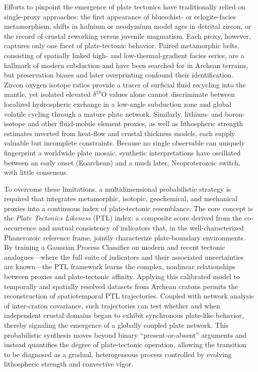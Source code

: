 \documentclass{article}
\begin{document}
Efforts to pinpoint the emergence of plate tectonics have traditionally relied on single-proxy approaches: the first appearance of blueschist- or eclogite-facies metamorphism, shifts in hafnium or neodymium model ages in detrital zircon, or the record of crustal reworking versus juvenile magmatism. Each proxy, however, captures only one facet of plate-tectonic behavior. Paired metamorphic belts, consisting of spatially linked high- and low-thermal-gradient facies series, are a hallmark of modern subduction and have been searched for in Archean terrains, but preservation biases and later overprinting confound their identification. Zircon oxygen isotope ratios provide a tracer of surficial fluid recycling into the mantle, yet isolated elevated \(\delta^{18}\text{O}\) values alone cannot discriminate between localized hydrospheric exchange in a low-angle subduction zone and global volatile cycling through a mature plate network. Similarly, lithium- and boron-isotope and other fluid-mobile element proxies, as well as lithospheric strength estimates inverted from heat-flow and crustal thickness models, each supply valuable but incomplete constraints. Because no single observable can uniquely fingerprint a worldwide plate mosaic, synthetic interpretations have oscillated between an early onset (Eoarchean) and a much later, Neoproterozoic switch, with little consensus.

To overcome these limitations, a multidimensional probabilistic strategy is required that integrates metamorphic, isotopic, geochemical, and mechanical proxies into a continuous index of plate-tectonic resemblance. The core concept is the \textit{Plate Tectonics Likeness} (PTL) index: a composite score derived from the co-occurrence and mutual consistency of indicators that, in the well-characterized Phanerozoic reference frame, jointly characterize plate-boundary environments. By training a Gaussian Process Classifier on modern and recent tectonic analogues—where the full suite of indicators and their associated uncertainties are known—the PTL framework learns the complex, nonlinear relationships between proxies and plate-tectonic affinity. Applying this calibrated model to temporally and spatially resolved datasets from Archean cratons permits the reconstruction of spatiotemporal PTL trajectories. Coupled with network analysis of inter-craton covariance, such trajectories can test whether and when independent crustal domains began to exhibit synchronous plate-like behavior, thereby signaling the emergence of a globally coupled plate network. This probabilistic synthesis moves beyond binary “present-or-absent” arguments and instead quantifies the degree of plate-tectonic operation, allowing the transition to be diagnosed as a gradual, heterogeneous process controlled by evolving lithospheric strength and convective vigor.
\end{document}
